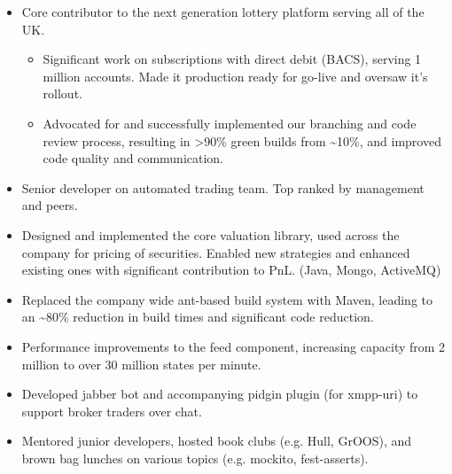 \documentclass[11pt,a4paper,roman]{moderncv}
\begin{document}
\begin{itemize}
\item Core contributor to the next generation lottery platform serving all of the UK.
  \begin{itemize}
  \item Significant work on subscriptions with direct debit (BACS), serving 1 million accounts. Made it production ready for go-live and oversaw it's rollout.
  \item Advocated for and successfully implemented our branching and code review process, resulting in >90\% green builds from \textasciitilde10\%, and improved code quality and communication.
  \end{itemize}
\end{itemize}

\vspace{5mm}

\begin{itemize}
\item Senior developer on automated trading team. Top ranked by management and peers.
\item Designed and implemented the core valuation library, used across the company for pricing of securities. Enabled new strategies and enhanced existing ones with significant contribution to PnL. (Java, Mongo, ActiveMQ)
\item Replaced the company wide ant-based build system with Maven, leading to an \textasciitilde80\% reduction in build times and significant code reduction.
\item Performance improvements to the feed component, increasing capacity from 2 million to over 30 million states per minute.
\item Developed jabber bot and accompanying pidgin plugin (for xmpp-uri) to support broker traders over chat.
\item Mentored junior developers, hosted book clubs (e.g. Hull, GrOOS), and brown bag lunches on various topics (e.g. mockito, fest-asserts).
\end{itemize}

\vspace{5mm}
\end{document}
